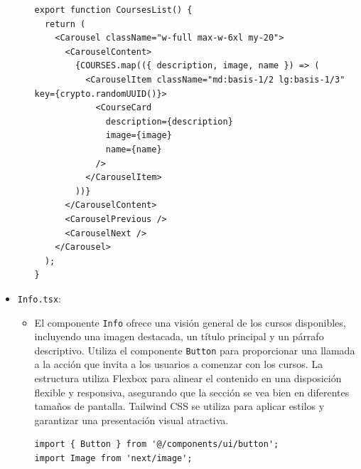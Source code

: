 \begin{itemize}
\begin{itemize}
\begin{verbatim}
export function CoursesList() {
  return (
    <Carousel className="w-full max-w-6xl my-20">
      <CarouselContent>
        {COURSES.map(({ description, image, name }) => (
          <CarouselItem className="md:basis-1/2 lg:basis-1/3" key={crypto.randomUUID()}>
            <CourseCard
              description={description}
              image={image}
              name={name}
            />
          </CarouselItem>
        ))}
      </CarouselContent>
      <CarouselPrevious />
      <CarouselNext />
    </Carousel>
  );
}
    \end{verbatim}
  \end{itemize} 
  \item \texttt{Info.tsx}:
  \begin{itemize}
    \item El componente \texttt{Info} ofrece una visión general de los cursos disponibles, incluyendo una imagen destacada, un título principal y un párrafo descriptivo. Utiliza el componente \texttt{Button} para proporcionar una llamada a la acción que invita a los usuarios a comenzar con los cursos. La estructura utiliza Flexbox para alinear el contenido en una disposición flexible y responsiva, asegurando que la sección se vea bien en diferentes tamaños de pantalla. Tailwind CSS se utiliza para aplicar estilos y garantizar una presentación visual atractiva.
    \begin{verbatim}
import { Button } from '@/components/ui/button';
import Image from 'next/image';


\end{verbatim}
\end{itemize}
\end{itemize}
